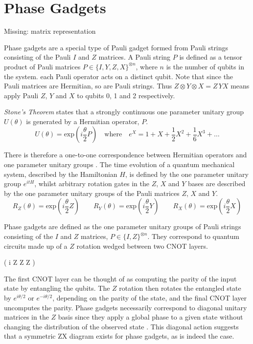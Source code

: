 \section{Phase Gadgets}
Missing: matrix representation

Phase gadgets are a special type of Pauli gadget formed from Pauli strings consisting of the Pauli $I$ and $Z$ matrices. A Pauli string $P$ is defined as a tensor product of Pauli matrices $P \in \{I, Y, Z, X\}^{\otimes n}$, where $n$ is the number of qubits in the system. each Pauli operator acts on a distinct qubit. Note that since the Pauli matrices are Hermitian, so are Pauli strings. Thus $Z \otimes Y \otimes X = Z \, YX$ means apply Pauli $Z$, $Y$ and $X$ to qubits 0, 1 and 2 respectively.

\textit{Stone's Theorem} \cite{Stone1932} states that a strongly continuous one parameter unitary group $U(\theta)$ is generated by a Hermitian operator, $P$.
\begin{equation*}
    U(\theta) = \text{exp}\left(i \frac{\theta}{2} P \right)
    \quad \text{where} \quad
    e^X = 1 + X + \frac{1}{2} X^2 + \frac{1}{6} X^3 + \dots
\end{equation*}

There is therefore a one-to-one correspondence between Hermitian operators and one parameter unitary groups \cite{Yeung2020}. The time evolution of a quantum mechanical system, described by the Hamiltonian $H$, is defined by the one parameter unitary group $e^{itH}$, whilst arbitrary rotation gates in the $Z$, $X$ and $Y$ bases are described by the one parameter unitary groups of the Pauli matrices $Z$, $X$ and $Y$.
\begin{equation*}
    R_Z(\theta) = \text{exp}\left(i \frac{\theta}{2} Z \right) \qquad
    R_Y(\theta) = \text{exp}\left(i \frac{\theta}{2} Y \right) \qquad
    R_X(\theta) = \text{exp}\left(i \frac{\theta}{2} X \right)
\end{equation*}

Phase gadgets are defined as the one parameter unitary groups of Pauli strings consisting of the $I$ and $Z$ matrices, $P \in \{I, Z\}^{\otimes n}$. They correspond to quantum circuits made up of a $Z$ rotation wedged between two CNOT layers.

{ \left( i  Z \otimes Z \otimes Z \right)}

The first CNOT layer can be thought of as computing the parity of the input state by entangling the qubits. The $Z$ rotation then rotates the entangled state by $e^{i\theta/2}$ or $e^{-i\theta/2}$, depending on the parity of the state, and the final CNOT layer uncomputes the parity. Phase gadgets necessarily correspond to diagonal unitary matrices in the $Z$ basis since they apply a global phase to a given state without changing the distribution of the observed state \cite{Yeung2020}. This diagonal action suggests that a symmetric ZX diagram exists for phase gadgets, as is indeed the case.

